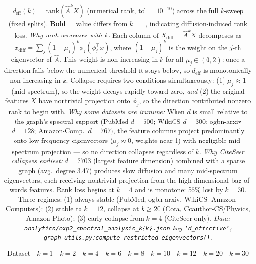 \documentclass[11pt]{article}
\begin{document}
\begin{table}[H]
\centering\small\setlength{\tabcolsep}{3.5pt}
\caption{$d_{\mathrm{eff}}(k) = \mathrm{rank}(\hat{A}^k X)$ (numerical rank, tol\,$=10^{-10}$)
across the full $k$-sweep (fixed splits).
\textbf{Bold} = value differs from $k{=}1$, indicating diffusion-induced rank loss.
\textit{Why rank decreases with $k$:}
Each column of $X_{\mathrm{diff}} = \hat{A}^k X$ decomposes as
$x_{\mathrm{diff}} = \sum_j (1{-}\mu_j)^k \phi_j(\phi_j^\top x)$,
where $(1{-}\mu_j)^k$ is the weight on the $j$-th eigenvector of $\hat{A}$.
This weight is non-increasing in $k$ for all $\mu_j \in (0,2)$: once a direction
falls below the numerical threshold it stays below, so $d_{\mathrm{eff}}$ is
monotonically non-increasing in $k$.
Collapse requires two conditions simultaneously: (1) $\mu_j \approx 1$
(mid-spectrum), so the weight decays rapidly toward zero, \emph{and}
(2) the original features $X$ have nontrivial projection onto $\phi_j$, so the
direction contributed nonzero rank to begin with.
\textit{Why some datasets are immune:}
When $d$ is small relative to the graph's spectral support
(PubMed $d{=}500$; WikiCS $d{=}300$; ogbn-arxiv $d{=}128$; Amazon-Comp.\ $d{=}767$),
the feature columns project predominantly onto low-frequency eigenvectors
($\mu_j \approx 0$, weights near 1) with negligible mid-spectrum projection ---
so no direction collapses regardless of $k$.
\textit{Why CiteSeer collapses earliest:}
$d{=}3703$ (largest feature dimension) combined with a sparse graph (avg.\ degree 3.47)
produces slow diffusion and many mid-spectrum eigenvectors, each receiving nontrivial
projection from the high-dimensional bag-of-words features.
Rank loss begins at $k{=}4$ and is monotone: 56\% lost by $k{=}30$.
Three regimes: (1) always stable (PubMed, ogbn-arxiv, WikiCS, Amazon-Computers);
(2) stable to $k{=}12$, collapse at $k{\geq}20$ (Cora, Coauthor-CS/Physics, Amazon-Photo);
(3) early collapse from $k{=}4$ (CiteSeer only).
\textit{\scriptsize Data: \texttt{analytics/exp2\_spectral\_analysis\_k\{k\}.json}
key \texttt{`d\_effective'}; \texttt{graph\_utils.py:compute\_restricted\_eigenvectors()}.}}
\label{tab:deff_vs_k}
\begin{tabular}{lrrrrrrrrr}
\toprule
Dataset & $k{=}1$ & $k{=}2$ & $k{=}4$ & $k{=}6$ & $k{=}8$ & $k{=}10$ & $k{=}12$ & $k{=}20$ & $k{=}30$ \\

\end{tabular}
\end{table}
\end{document}
